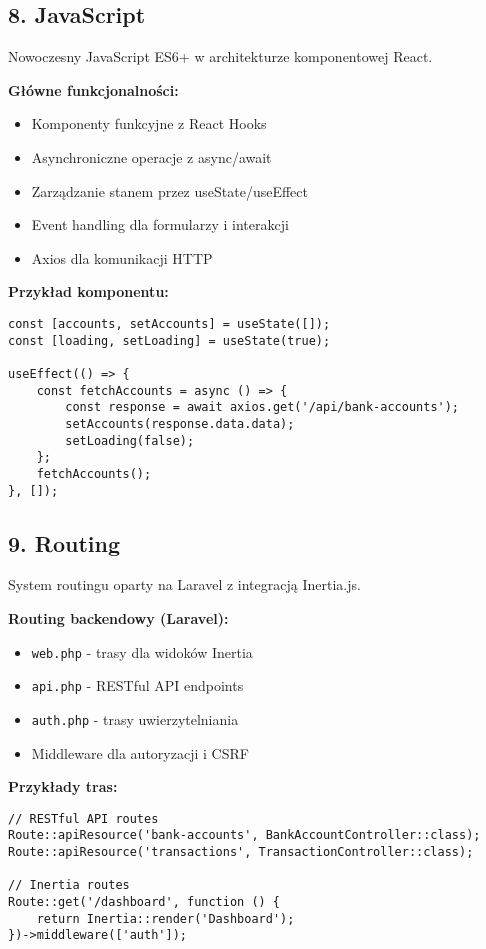 \subsection{8. JavaScript}

Nowoczesny JavaScript ES6+ w architekturze komponentowej React.

\textbf{Główne funkcjonalności:}
\begin{itemize}
    \item Komponenty funkcyjne z React Hooks
    \item Asynchroniczne operacje z async/await
    \item Zarządzanie stanem przez useState/useEffect
    \item Event handling dla formularzy i interakcji
    \item Axios dla komunikacji HTTP
\end{itemize}

\textbf{Przykład komponentu:}
\begin{verbatim}
const [accounts, setAccounts] = useState([]);
const [loading, setLoading] = useState(true);

useEffect(() => {
    const fetchAccounts = async () => {
        const response = await axios.get('/api/bank-accounts');
        setAccounts(response.data.data);
        setLoading(false);
    };
    fetchAccounts();
}, []);
\end{verbatim}

\subsection{9. Routing}

System routingu oparty na Laravel z integracją Inertia.js.

\textbf{Routing backendowy (Laravel):}
\begin{itemize}
    \item \texttt{web.php} - trasy dla widoków Inertia
    \item \texttt{api.php} - RESTful API endpoints
    \item \texttt{auth.php} - trasy uwierzytelniania
    \item Middleware dla autoryzacji i CSRF
\end{itemize}

\textbf{Przykłady tras:}
\begin{verbatim}
// RESTful API routes
Route::apiResource('bank-accounts', BankAccountController::class);
Route::apiResource('transactions', TransactionController::class);

// Inertia routes
Route::get('/dashboard', function () {
    return Inertia::render('Dashboard');
})->middleware(['auth']);
\end{verbatim}

